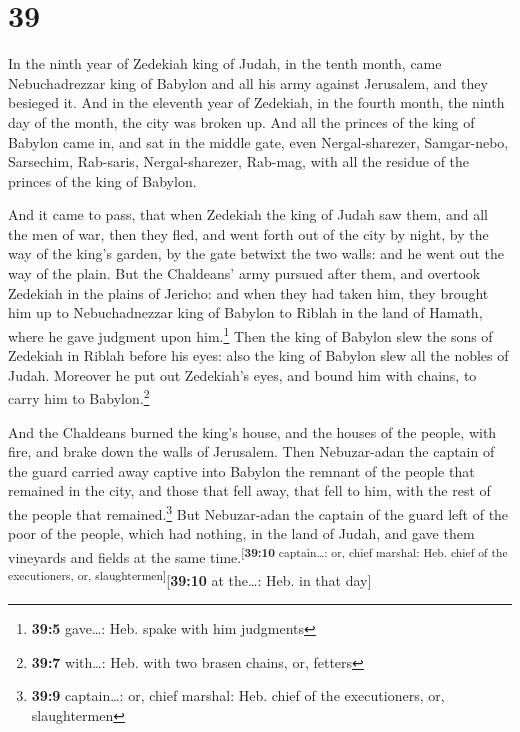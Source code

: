 \hypertarget{section-38}{%
\section{39}\label{section-38}}

 In the ninth year of Zedekiah king of Judah, in the tenth
month, came Nebuchadrezzar king of Babylon and all his army against
Jerusalem, and they besieged it.  And in the eleventh year
of Zedekiah, in the fourth month, the ninth day of the month, the city
was broken up.  And all the princes of the king of Babylon
came in, and sat in the middle gate, even Nergal-sharezer, Samgar-nebo,
Sarsechim, Rab-saris, Nergal-sharezer, Rab-mag, with all the residue of
the princes of the king of Babylon.

 And it came to pass, that when Zedekiah the king of Judah
saw them, and all the men of war, then they fled, and went forth out of
the city by night, by the way of the king's garden, by the gate betwixt
the two walls: and he went out the way of the plain.  But
the Chaldeans' army pursued after them, and overtook Zedekiah in the
plains of Jericho: and when they had taken him, they brought him up to
Nebuchadnezzar king of Babylon to Riblah in the land of Hamath, where he
gave judgment upon him.\footnote{\textbf{39:5} gave\ldots: Heb. spake
  with him judgments}  Then the king of Babylon slew the
sons of Zedekiah in Riblah before his eyes: also the king of Babylon
slew all the nobles of Judah.  Moreover he put out
Zedekiah's eyes, and bound him with chains, to carry him to
Babylon.\footnote{\textbf{39:7} with\ldots: Heb. with two brasen chains,
  or, fetters}

 And the Chaldeans burned the king's house, and the houses
of the people, with fire, and brake down the walls of Jerusalem.
 Then Nebuzar-adan the captain of the guard carried away
captive into Babylon the remnant of the people that remained in the
city, and those that fell away, that fell to him, with the rest of the
people that remained.\footnote{\textbf{39:9} captain\ldots: or, chief
  marshal: Heb. chief of the executioners, or, slaughtermen}
 But Nebuzar-adan the captain of the guard left of the
poor of the people, which had nothing, in the land of Judah, and gave
them vineyards and fields at the same
time.\textsuperscript{{[}\textbf{39:10} captain\ldots: or, chief
marshal: Heb. chief of the executioners, or,
slaughtermen{]}}{[}\textbf{39:10} at the\ldots: Heb. in that day{]}

